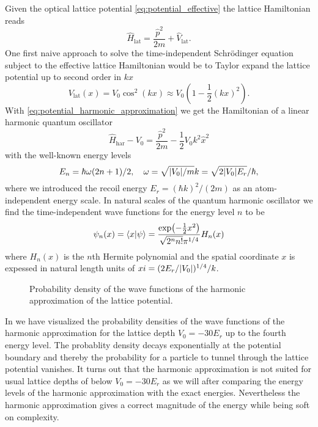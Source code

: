 Given the optical lattice potential \cref{eq:potential_effective} the
lattice Hamiltonian reads
\begin{equation}
  \hat{H}_\text{lat}
  =\frac{\hat{p}^2}{2m}+\hat{V}_\text{lat}
  \label{eq:hamiltonian_lattice}.
\end{equation}
One first naive approach to solve the time-independent Schrödinger equation
subject to the effective lattice Hamiltonian would be to Taylor expand
the lattice potential up to second order in $kx$
\begin{equation}
  V_\text{lat}(x)
  =V_0\cos^2(kx)
  \approx V_0\left(1-\frac{1}{2}(kx)^2\right)
  \label{eq:potential_harmonic_approximation}.
\end{equation}
With \cref{eq:potential_harmonic_approximation} we get the Hamiltonian of a
linear harmonic quantum oscillator
\begin{equation}
  \hat{H}_\text{har}-V_0
  =\frac{\hat{p}^2}{2m}-\frac{1}{2}V_0k^2\hat{x}^2
  \label{eq:hamiltonian_harmonic_approximation}
\end{equation}
with the well-known energy levels
\begin{equation}
  E_n=\hbar\omega(2n+1)/2
  \qc
  \omega=\sqrt{\abs{V_0}/m}k=\sqrt{2\abs{V_0}E_r}/\hbar,
  \label{eq:energy_harmonic_approximation}
\end{equation}
where we introduced the recoil energy $E_r=(\hbar k)^2/(2m)$ as an
atom-independent energy scale. In natural scales of the quantum harmonic
oscillator we find the time-independent wave functions for the energy level
$n$ to be
\begin{equation}
  \psi_n(x)
  =
  \bra{x}\ket{\psi}
  =
  \frac{\exp(-\frac{1}{2}x^2)}{\sqrt{2^nn!}\pi^{1/4}}H_n(x)
  \label{eq:wavefunction_harmonic}
\end{equation}
where $H_n(x)$ is the $n$th Hermite polynomial and the spatial coordinate $x$
is expessed in natural length units of $xi=(2E_r/\abs{V_0})^{1/4}/k$.
\begin{figure}[htb]
  \centering
  \begin{adjustbox}{width=\textwidth}
    
  \end{adjustbox}
  \caption{Probability density of the wave functions of the harmonic
    approximation of the lattice potential.
  }\label{fig:scale_harmonic}
\end{figure}
In  we have visualized the probability densities of
the wave functions of the harmonic approximation for the lattice depth
$V_0=-30E_r$ up to the fourth energy level. The probablity density decays
exponentially at the potential boundary and thereby the probability for a
particle to tunnel through the lattice potential vanishes. It turns out that
the harmonic approximation is not suited for usual lattice depths of below
$V_0=-30E_r$ as we will after comparing the energy levels of the harmonic
approximation with the exact energies. Nevertheless the harmonic approximation
gives a correct magnitude of the energy while being soft on complexity.

